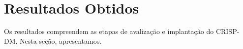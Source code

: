 \section{Resultados Obtidos}

Os resultados compreendem as etapas de avalização e implantação do CRISP-DM. Nesta seção, apresentamos.